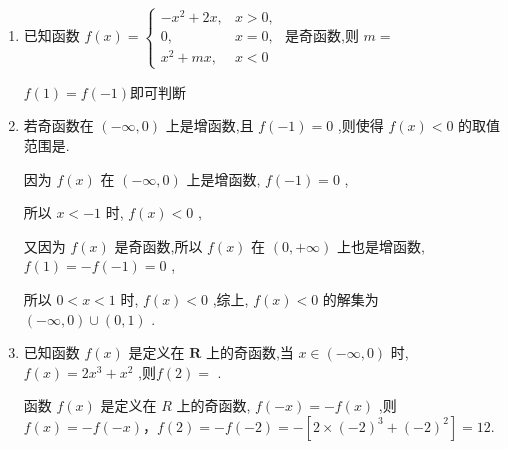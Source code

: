 \begin{enumerate}
\begin{jieda}
        所以 $f\left( \pi \right)  = f\left( {-\pi }\right)  < f\left( {-3}\right)  < f\left( {-\sqrt{3}}\right)$ .
    \end{jieda}
    
    \item 已知函数 $f\left( x\right)  = \left\{  \begin{array}{ll}  - {x}^{2} + {2x}, & x > 0, \\  0, & x = 0, \\  {x}^{2} + {mx}, & x < 0 \end{array}\right.$ 是奇函数,则 $m =$ 
    \begin{jieda}
        $f(1) = f(-1)$即可判断
    \end{jieda}
    
    \item 若奇函数在 $\left( {-\infty ,0}\right)$ 上是增函数,且 $f\left( {-1}\right)  = 0$ ,则使得 $f\left( x\right)  < 0$ 的取值范围是.
    \begin{jieda}
        因为 $f\left( x\right)$ 在 $\left( {-\infty ,0}\right)$ 上是增函数, $f\left( {-1}\right)  = 0$ ,
        
        所以 $x <  - 1$ 时, $f\left( x\right)  < 0$ ,
        
        又因为 $f\left( x\right)$ 是奇函数,所以 $f\left( x\right)$ 在 $\left( {0, + \infty }\right)$ 上也是增函数, $f\left( 1\right)  =  - f\left( {-1}\right)  = 0$ ,
        
        所以 $0 < x < 1$ 时, $f\left( x\right)  < 0$ ,综上, $f\left( x\right)  < 0$ 的解集为 $\left( {-\infty ,0}\right)  \cup  \left( {0,1}\right)$ .
    \end{jieda}
    \item 已知函数 $f\left( x\right)$ 是定义在 $\mathbf{R}$ 上的奇函数,当 $x \in  \left( {-\infty ,0}\right)$ 时, $f\left( x\right)  = 2{x}^{3} + {x}^{2}$ ,则$f\left( 2\right)  =$ .
    \begin{jieda}
        函数 $f\left( x\right)$ 是定义在 $R$ 上的奇函数, $f\left( {-x}\right)  =  - f\left( x\right)$ ,则 $f\left( x\right)  =  - f\left( {-x}\right)$，$f\left( 2\right)  =  - f\left( {-2}\right)  =  - \left\lbrack  {2 \times  {\left( -2\right) }^{3} + {\left( -2\right) }^{2}}\right\rbrack  = {12}.$
    \end{jieda}
\end{enumerate}
\clearpage
